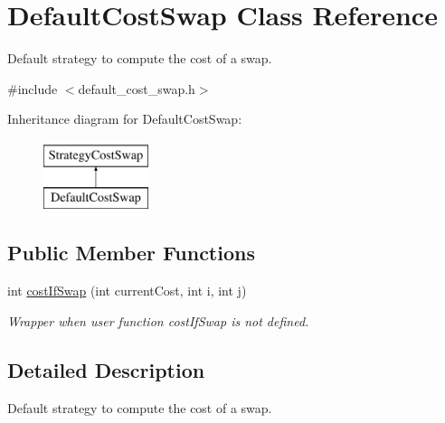 \hypertarget{classDefaultCostSwap}{\section{\-Default\-Cost\-Swap \-Class \-Reference}
\label{classDefaultCostSwap}
}


\-Default strategy to compute the cost of a swap.  




{\ttfamily \#include $<$default\-\_\-cost\-\_\-swap.\-h$>$}

\-Inheritance diagram for \-Default\-Cost\-Swap\-:\begin{figure}[H]
\begin{center}
\leavevmode
\includegraphics[height=2.000000cm]{classDefaultCostSwap}
\end{center}
\end{figure}
\subsection*{\-Public \-Member \-Functions}
\begin{DoxyCompactItemize}
\item 
int \hyperlink{classDefaultCostSwap_a62c43925fb3f931b12f92d3a1bbfc55f}{cost\-If\-Swap} (int current\-Cost, int i, int j)
\begin{DoxyCompactList}\small\item\em \-Wrapper when user function cost\-If\-Swap is not defined. \end{DoxyCompactList}\end{DoxyCompactItemize}


\subsection{\-Detailed \-Description}
\-Default strategy to compute the cost of a swap. 

